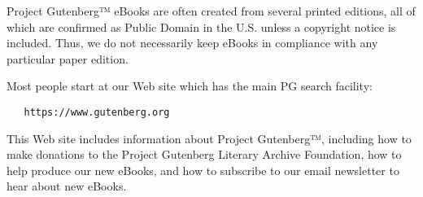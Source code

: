 {Project Gutenberg™ eBooks are often created from several printed
editions, all of which are confirmed as Public Domain in the U.S.
unless a copyright notice is included. Thus, we do not necessarily
keep eBooks in compliance with any particular paper edition.

Most people start at our Web site which has the main PG search facility:

\begin{verbatim}
   https://www.gutenberg.org
\end{verbatim}

This Web site includes information about Project Gutenberg™,
including how to make donations to the Project Gutenberg Literary
Archive Foundation, how to help produce our new eBooks, and how to
subscribe to our email newsletter to hear about new eBooks.

}

\threeast

